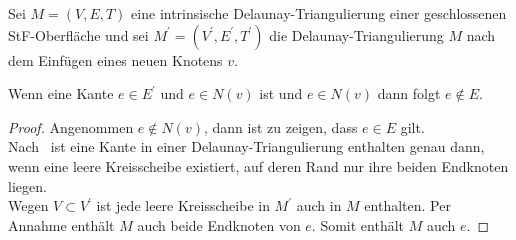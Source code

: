 \begin{lemma}
\label{le:adejazent}
Sei $M = (V,E,T)$ eine intrinsische Delaunay-Triangulierung  einer geschlossenen  StF-Oberfläche und sei $M^\prime = (V^\prime,E^\prime,T^\prime)$ die Delaunay-Triangulierung  $M$ nach dem Einfügen eines neuen Knotens $v$.
 


Wenn eine Kante $e \in E^\prime$ und $e \in N(v)$ ist und $e \in  N(v)$
dann folgt $e \not \in   E $.\\




\end{lemma}








\begin{proof}

Angenommen $e \not \in  N(v)$, dann ist zu zeigen, dass $e\in E $ gilt.\\

Nach~\cite[Definition 3]{Bobenko:2007:LaplaceBeltrami} ist eine Kante in einer Delaunay-Triangulierung  enthalten genau dann, wenn eine leere Kreisscheibe existiert, auf deren Rand nur ihre beiden Endknoten liegen.\\ 

    Wegen $V \subset V^\prime$  ist jede leere Kreisscheibe in $M^\prime$  auch in  $M$ enthalten. Per Annahme enthält $M$ auch beide Endknoten von $e$. Somit enthält $M$ auch $e$.     
\end{proof}


